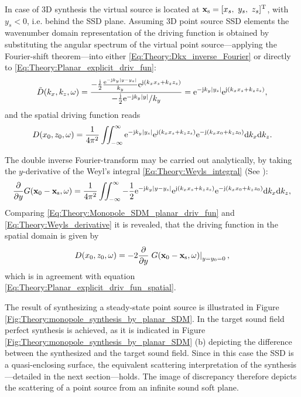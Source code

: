 \vspace{3mm}
In case of 3D synthesis the virtual source is located at $\mathbf{x}_{\mathrm{s}} = [x_s,\ y_s,\ z_s]^{\mathrm{T}}$, with $y_s<0$, i.e. behind the SSD plane.
Assuming 3D point source SSD elements the wavenumber domain representation of the driving function is obtained by substituting the angular spectrum of the virtual point source---applying the Fourier-shift theorem---into either \eqref{Eq:Theory:Dkx_inverse_Fourier} or directly to \eqref{Eq:Theory:Planar_explicit_driv_fun}:
\begin{equation}
\tilde{D}(k_x,k_z,\omega) =  \frac{-\frac{\mathrm{j}}{2} \frac{ \mathrm{e}^{-\mathrm{j} k_y | y - y_s|} }{ k_y} \mathrm{e}^{\mathrm{j} (k_x x_s +k_z z_s)} }{-\frac{\mathrm{j}}{2} \mathrm{e}^{-\mathrm{j} k_y | y |} / k_y   } = \mathrm{e}^{-\mathrm{j} k_y |y_s|}\mathrm{e}^{\mathrm{j} (k_x x_s +k_z z_s)},
\end{equation}
and the spatial driving function reads
\begin{equation}
D(x_0,z_0,\omega) = \frac{1}{4\pi^2} \iint_{-\infty}^{\infty} \mathrm{e}^{-\mathrm{j} k_y |y_s|}\mathrm{e}^{\mathrm{j} (k_x x_s +k_z z_s)} \mathrm{e}^{-\mathrm{j} (k_x x_0 + k_z z_0)} \mathrm{d} k_x \mathrm{d} k_z.
\label{Eq:Theory:Monopole_SDM_planar_driv_fun}
\end{equation}

The double inverse Fourier-transform may be carried out analytically, by taking the $y$-derivative of the Weyl's integral \eqref{Eq:Theory:Weyls_integral} (See \cite[(2.65)]{Williams1999}):
\begin{equation}
\frac{\partial}{\partial y} G(\mathbf{x}_0 - \mathbf{x}_{\mathrm{s}},\omega ) = 
\frac{1}{4\pi^2} \iint_{-\infty}^{\infty} -\frac{1}{2} \mathrm{e}^{ -\mathrm{j} k_y  | y - y_s |  }
\mathrm{e}^{\mathrm{j} (k_x x_s + k_z z_s)} \mathrm{e}^{-\mathrm{j} (k_x x_0 + k_z z_0)} \mathrm{d} k_x \mathrm{d} k_z,
\label{Eq:Theory:Weyls_derivative}
\end{equation}
Comparing \eqref{Eq:Theory:Monopole_SDM_planar_driv_fun} and \eqref{Eq:Theory:Weyls_derivative} it is revealed, that the driving function in the spatial domain is given by
\begin{equation}
D(x_0,z_0,\omega) = -2 \frac{\partial}{\partial y} \left. G(\mathbf{x}_0 - \mathbf{x}_{\mathrm{s}},\omega )\right|_{y = y_0 = 0},
\end{equation}
which is in agreement with equation \eqref{Eq:Theory:Planar_explicit_driv_fun_spatial}.

The result of synthesizing a steady-state point source is illustrated in Figure \ref{Fig:Theory:monopole_synthesis_by_planar_SDM}. In the target sound field perfect synthesis is achieved, as it is indicated in Figure \ref{Fig:Theory:monopole_synthesis_by_planar_SDM} (b) depicting the difference between the synthesized and the target sound field. Since in this case the SSD is a quasi-enclosing surface, the equivalent scattering interpretation of the synthesis---detailed in the next section---holds. The image of discrepancy therefore depicts the scattering of a point source from an infinite sound soft plane. 

